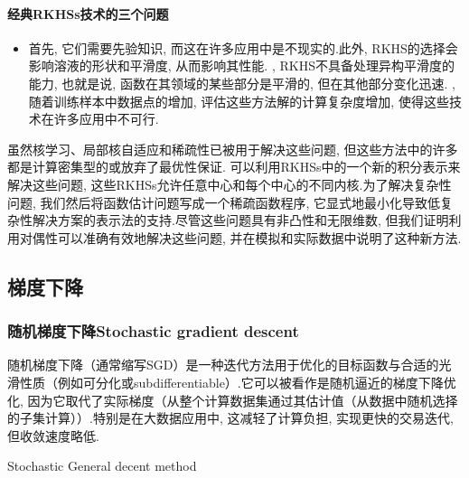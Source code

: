 \paragraph{经典RKHSs技术的三个问题} \cite{peifer2020sparse}
 \begin{itemize}
     \item 首先, 它们需要先验知识, 而这在许多应用中是不现实的.此外, RKHS的选择会影响溶液的形状和平滑度, 从而影响其性能.
     , RKHS不具备处理异构平滑度的能力, 也就是说, 函数在其领域的某些部分是平滑的, 但在其他部分变化迅速.
     , 随着训练样本中数据点的增加, 评估这些方法解的计算复杂度增加, 使得这些技术在许多应用中不可行.
    
 \end{itemize}
 虽然核学习、局部核自适应和稀疏性已被用于解决这些问题, 但这些方法中的许多都是计算密集型的或放弃了最优性保证.
 可以利用RKHSs中的一个新的积分表示来解决这些问题, 这些RKHSs允许任意中心和每个中心的不同内核.为了解决复杂性问题, 我们然后将函数估计问题写成一个稀疏函数程序, 它显式地最小化导致低复杂性解决方案的表示法的支持.尽管这些问题具有非凸性和无限维数, 但我们证明利用对偶性可以准确有效地解决这些问题, 并在模拟和实际数据中说明了这种新方法.
\subsection{梯度下降}
\subsubsection{随机梯度下降Stochastic gradient descent}
随机梯度下降（通常缩写SGD）是一种迭代方法用于优化的目标函数与合适的光滑性质（例如可分化或subdifferentiable）.它可以被看作是随机逼近的梯度下降优化, 因为它取代了实际梯度（从整个计算数据集通过其估计值（从数据中随机选择的子集计算））.特别是在大数据应用中, 这减轻了计算负担, 实现更快的交易迭代, 但收敛速度略低. 
\begin{algorithm}  
    \caption{ Stochastic  General decent method}  
    \begin{algorithmic}
    \end{algorithmic}  
   \end{algorithm}  
